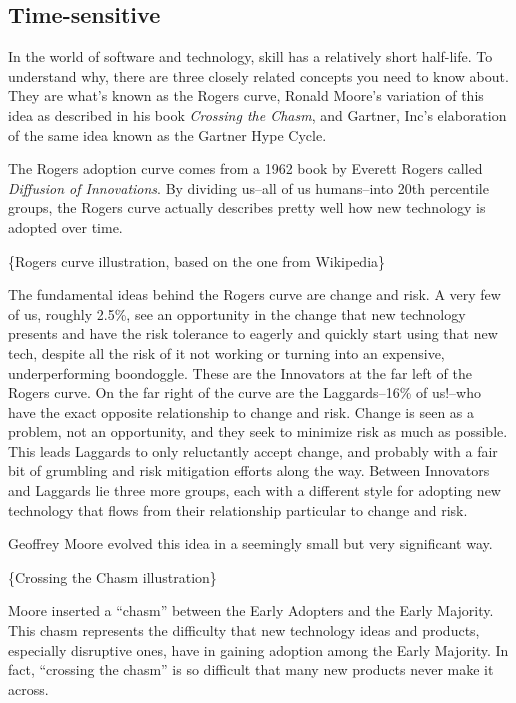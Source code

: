 \subsection{Time-sensitive}

In the world of software and technology, skill has a relatively short half-life. To understand why, there are three closely related concepts you need to know about. They are what's known as the Rogers curve, Ronald Moore's variation of this idea as described in his book \emph{Crossing the Chasm}, and Gartner, Inc's elaboration of the same idea known as the Gartner Hype Cycle.

The Rogers adoption curve comes from a 1962 book by Everett Rogers called \emph{Diffusion of Innovations}. By dividing us--all of us humans--into 20th percentile groups, the Rogers curve actually describes pretty well how new technology is adopted over time.

\{Rogers curve illustration, based on the one from Wikipedia\}

The fundamental ideas behind the Rogers curve are change and risk. A very few of us, roughly 2.5\%, see an opportunity in the change that new technology presents and have the risk tolerance to eagerly and quickly start using that new tech, despite all the risk of it not working or turning into an expensive, underperforming boondoggle. These are the Innovators at the far left of the Rogers curve. On the far right of the curve are the Laggards--16\% of us!--who have the exact opposite relationship to change and risk. Change is seen as a problem, not an opportunity, and they seek to minimize risk as much as possible. This leads Laggards to only reluctantly accept change, and probably with a fair bit of grumbling and risk mitigation efforts along the way. Between Innovators and Laggards lie three more groups, each with a different style for adopting new technology that flows from their relationship particular to change and risk.

Geoffrey Moore evolved this idea in a seemingly small but very significant way.

\{Crossing the Chasm illustration\}

Moore inserted a ``chasm'' between the Early Adopters and the Early Majority. This chasm represents the difficulty that new technology ideas and products, especially disruptive ones, have in gaining adoption among the Early Majority.  In fact, ``crossing the chasm'' is so difficult that many new products never make it across.

